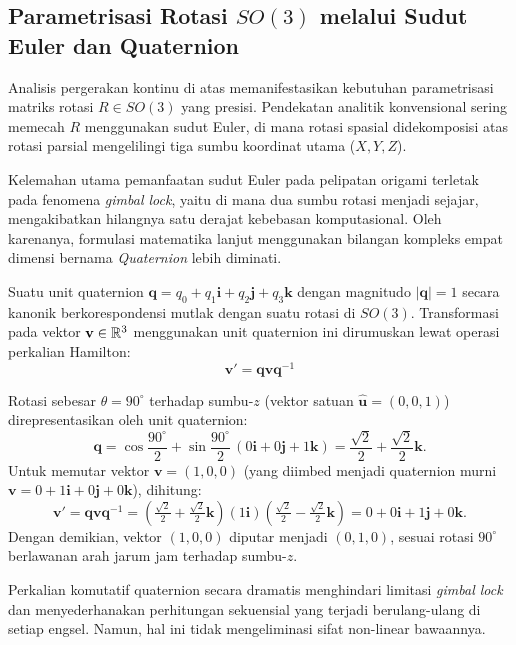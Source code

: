 \subsection{Parametrisasi Rotasi $SO(3)$ melalui Sudut Euler dan Quaternion}
Analisis pergerakan kontinu di atas memanifestasikan kebutuhan parametrisasi matriks rotasi $R \in SO(3)$ yang presisi. Pendekatan analitik konvensional sering memecah $R$ menggunakan sudut Euler, di mana rotasi spasial didekomposisi atas rotasi parsial mengelilingi tiga sumbu koordinat utama ($X, Y, Z$).

Kelemahan utama pemanfaatan sudut Euler pada pelipatan origami terletak pada fenomena \textit{gimbal lock}, yaitu di mana dua sumbu rotasi menjadi sejajar, mengakibatkan hilangnya satu derajat kebebasan komputasional. Oleh karenanya, formulasi matematika lanjut menggunakan bilangan kompleks empat dimensi bernama \textit{Quaternion} lebih diminati.
\begin{definisi}
  Suatu unit quaternion $\mathbf{q} = q_0 + q_1 \mathbf{i} + q_2 \mathbf{j} + q_3 \mathbf{k}$ dengan magnitudo $|\mathbf{q}| = 1$ secara kanonik berkorespondensi mutlak dengan suatu rotasi di $SO(3)$. Transformasi pada vektor $\mathbf{v} \in \mathbb{R}^3$ menggunakan unit quaternion ini dirumuskan lewat operasi perkalian Hamilton:
  \[
    \mathbf{v}' = \mathbf{q} \mathbf{v} \mathbf{q}^{-1}
  \]
\end{definisi}

\begin{contoh}
  Rotasi sebesar $\theta = 90^\circ$ terhadap sumbu-$z$ (vektor satuan $\hat{\mathbf{u}} = (0,0,1)$) direpresentasikan oleh unit quaternion:
  \[
    \mathbf{q} = \cos\frac{90^\circ}{2} + \sin\frac{90^\circ}{2}\,(0\mathbf{i} + 0\mathbf{j} + 1\mathbf{k}) = \frac{\sqrt{2}}{2} + \frac{\sqrt{2}}{2}\mathbf{k}.
  \]
  Untuk memutar vektor $\mathbf{v} = (1, 0, 0)$ (yang diimbed menjadi quaternion murni $\mathbf{v} = 0 + 1\mathbf{i} + 0\mathbf{j} + 0\mathbf{k}$), dihitung:
  \[
    \mathbf{v}' = \mathbf{q}\mathbf{v}\mathbf{q}^{-1} = \left(\tfrac{\sqrt{2}}{2} + \tfrac{\sqrt{2}}{2}\mathbf{k}\right)(1\mathbf{i})\left(\tfrac{\sqrt{2}}{2} - \tfrac{\sqrt{2}}{2}\mathbf{k}\right) = 0 + 0\mathbf{i} + 1\mathbf{j} + 0\mathbf{k}.
  \]
  Dengan demikian, vektor $(1,0,0)$ diputar menjadi $(0,1,0)$, sesuai rotasi $90^\circ$ berlawanan arah jarum jam terhadap sumbu-$z$.
\end{contoh}

Perkalian komutatif quaternion secara dramatis menghindari limitasi \textit{gimbal lock} dan menyederhanakan perhitungan sekuensial yang terjadi berulang-ulang di setiap engsel. Namun, hal ini tidak mengeliminasi sifat non-linear bawaannya.

